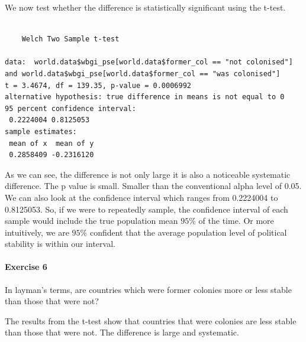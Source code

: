 \documentclass[]{article}
\newenvironment{Shaded}{\begin{snugshade}}{\end{snugshade}}
\newcommand{\KeywordTok}[1]{\textcolor[rgb]{0.13,0.29,0.53}{\textbf{#1}}}
\newcommand{\DataTypeTok}[1]{\textcolor[rgb]{0.13,0.29,0.53}{#1}}
\newcommand{\DecValTok}[1]{\textcolor[rgb]{0.00,0.00,0.81}{#1}}
\newcommand{\StringTok}[1]{\textcolor[rgb]{0.31,0.60,0.02}{#1}}
\newcommand{\CommentTok}[1]{\textcolor[rgb]{0.56,0.35,0.01}{\textit{#1}}}
\newcommand{\OperatorTok}[1]{\textcolor[rgb]{0.81,0.36,0.00}{\textbf{#1}}}
\newcommand{\NormalTok}[1]{#1}
\let\oldparagraph\paragraph
\renewcommand{\paragraph}[1]{\oldparagraph{#1}\mbox{}}
\theoremstyle{definition}
\theoremstyle{definition}
\theoremstyle{definition}
\theoremstyle{remark}
\begin{document}
We now test whether the difference is statistically significant using
the t-test.

\begin{Shaded}
\end{Shaded}

\begin{verbatim}

    Welch Two Sample t-test

data:  world.data$wbgi_pse[world.data$former_col == "not colonised"] and world.data$wbgi_pse[world.data$former_col == "was colonised"]
t = 3.4674, df = 139.35, p-value = 0.0006992
alternative hypothesis: true difference in means is not equal to 0
95 percent confidence interval:
 0.2224004 0.8125053
sample estimates:
 mean of x  mean of y 
 0.2858409 -0.2316120 
\end{verbatim}

As we can see, the difference is not only large it is also a noticeable
systematic difference. The p value is small. Smaller than the
conventional alpha level of 0.05. We can also look at the confidence
interval which ranges from 0.2224004 to 0.8125053. So, if we were to
repeatedly sample, the confidence interval of each sample would include
the true population mean \(95\%\) of the time. Or more intuitively, we
are \(95\%\) confident that the average population level of political
stability is within our interval.

\paragraph{Exercise 6}\label{exercise-6-3}

In layman's terms, are countries which were former colonies more or less
stable than those that were not?

The results from the t-test show that countries that were colonies are
less stable than those that were not. The difference is large and
systematic.
\end{document}
